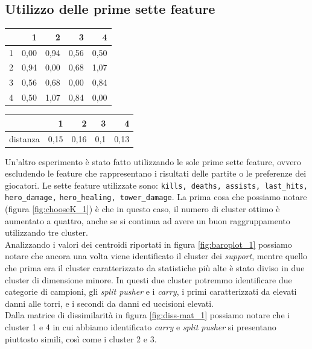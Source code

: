 \documentclass[a4paper,12pt,openany,oneside]{book}
\begin{document}
\subsection{Utilizzo delle prime sette feature}
\begin{table}[!h]
	\scriptsize	
	\centering	
	\begin{tabularx}{0.27\textwidth}{r | rrrr} 
		& 1    & 2    & 3    & 4    \\
		\midrule
		1 & 0,00 & 0,94 & 0,56 & 0,50 \\
		2 & 0,94 & 0,00 & 0,68 & 1,07 \\
		3 & 0,56 & 0,68 & 0,00 & 0,84 \\
		4 & 0,50 & 1,07 & 0,84 & 0,00 \\
	\end{tabularx}
	\hspace{6em}
	\begin{tabularx}{0.32\textwidth}{r | rrrr} 
         & 1    & 2    & 3   & 4	\\
         \midrule
         distanza & 0,15 & 0,16 & 0,1 & 0,13 \\
	\end{tabularx}
\end{table}
Un'altro esperimento è stato fatto utilizzando le sole prime sette feature, ovvero escludendo le feature che rappresentano i risultati delle partite o le preferenze dei giocatori. Le sette feature utilizzate sono: \verb|kills, deaths, assists, last_hits, hero_damage,| \verb|hero_healing, tower_damage|.
La prima cosa che possiamo notare (figura \ref{fig:chooseK_1}) è che in questo caso, il numero di cluster ottimo è aumentato a quattro, anche se si continua ad avere un buon raggruppamento utilizzando tre cluster.\\
Analizzando i valori dei centroidi riportati in figura \ref{fig:baroplot_1} possiamo notare che ancora una volta viene identificato il cluster dei \textit{support}, mentre quello che prima era il cluster caratterizzato da statistiche più alte è stato diviso in due cluster di dimensione minore. In questi due cluster potremmo identificare due categorie di campioni, gli \textit{split pusher} e i \textit{carry}, i primi caratterizzati da elevati danni alle torri, e i secondi da danni ed uccisioni elevati.\\
Dalla matrice di dissimilarità in figura \ref{fig:diss-mat_1} possiamo notare che i cluster 1 e 4 in cui abbiamo identificato \textit{carry} e \textit{split pusher} si presentano piuttosto simili, così come i cluster 2 e 3.
\end{document}
